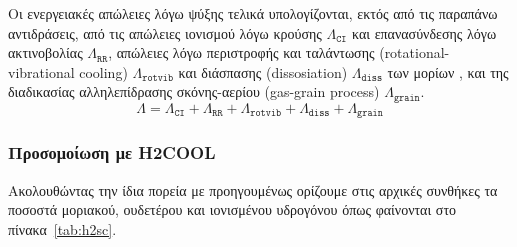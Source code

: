 	Οι ενεργειακές απώλειες λόγω ψύξης τελικά υπολογίζονται, εκτός από τις παραπάνω αντιδράσεις, από τις απώλειες ιονισμού λόγω κρούσης $\Lambda _{\mathtt{CI}}$ και επανασύνδεσης λόγω ακτινοβολίας $\Lambda _{\mathtt{RR}}$, απώλειες λόγω περιστροφής και ταλάντωσης (rotational-vibrational cooling) $\Lambda _{\mathtt{rotvib}}$ και διάσπασης (dissosiation) $\Lambda _{\mathtt{diss}}$ των μορίων , και της διαδικασίας αλληλεπίδρασης σκόνης-αερίου (gas-grain process) $\Lambda _{\mathtt{grain}}$.
	\begin{equation}
	\Lambda = \Lambda _{\mathtt{CI}} + \Lambda _{\mathtt{RR}} +\Lambda _{\mathtt{rotvib}} + \Lambda _{\mathtt{diss}} + \Lambda _{\mathtt{grain}}
	\end{equation}
	
%

	\subsubsection{Προσομοίωση με H2COOL}

	Ακολουθώντας την ίδια πορεία με προηγουμένως ορίζουμε στις αρχικές συνθήκες τα ποσοστά μοριακού, ουδετέρου και ιονισμένου υδρογόνου όπως φαίνονται στο πίνακα~\ref{tab:h2sc}.
	
